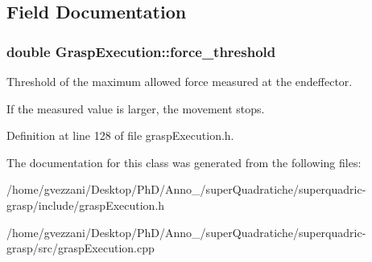 \subsection{Field Documentation}
\subsubsection[{\texorpdfstring{force\+\_\+threshold}{force_threshold}}]{\setlength{\rightskip}{0pt plus 5cm}double Grasp\+Execution\+::force\+\_\+threshold\hspace{0.3cm}{\ttfamily [protected]}}\label{classGraspExecution_a26278749ada92b79a85100ffc3b7588f}


Threshold of the maximum allowed force measured at the endeffector. 

If the measured value is larger, the movement stops. 

Definition at line 128 of file grasp\+Execution.\+h.



The documentation for this class was generated from the following files\+:\begin{DoxyCompactItemize}
\item 
/home/gvezzani/\+Desktop/\+Ph\+D/\+Anno\+\_/super\+Quadratiche/superquadric-\/grasp/include/grasp\+Execution.\+h\item 
/home/gvezzani/\+Desktop/\+Ph\+D/\+Anno\+\_/super\+Quadratiche/superquadric-\/grasp/src/grasp\+Execution.\+cpp\end{DoxyCompactItemize}
